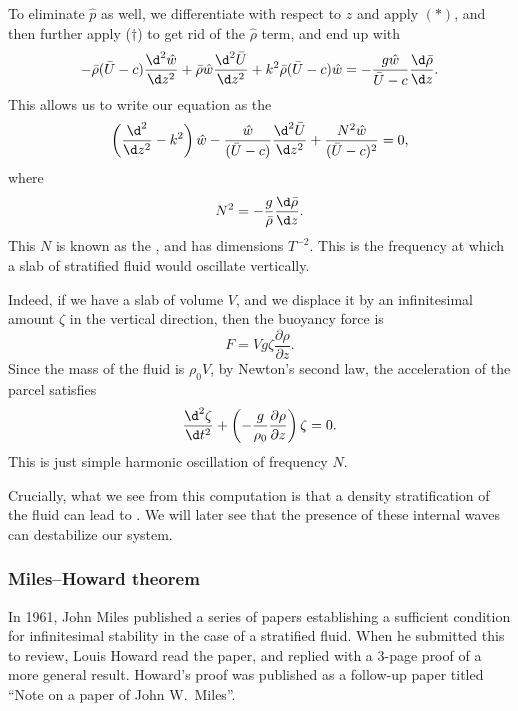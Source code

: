 \documentclass[a4paper]{article}
\begin{document}
To eliminate $\hat{p}$ as well, we differentiate with respect to $z$ and apply $(*)$, and then further apply ($\dagger$) to get rid of the $\hat{\rho}$ term, and end up with
\[
  - \bar{\rho} (\bar{U} - c) \frac{\d^2 \hat{w}}{\d z^2} + \bar{\rho} \hat{w} \frac{\d^2 \bar{U}}{\d z^2} + k^2 \bar{\rho}(\bar{U} - c) \hat{w} = - \frac{g \hat{w}}{\bar{U} - c} \frac{\d \bar{\rho}}{\d z}.
\]
This allows us to write our equation as the 
\[
  \left(\frac{\d^2}{\d z^2} - k^2\right) \hat{w} - \frac{\hat{w}}{(\bar{U} - c)} \frac{\d^2 \bar{U}}{\d z^2} + \frac{N^2 \hat{w}}{(\bar{U} - c)^2} = 0,
\]
where
\[
  N^2 = - \frac{g}{\bar{\rho}} \frac{\d \bar{\rho}}{\d z}.
\]
This $N$ is known as the , and has dimensions $T^{-2}$. This is the frequency at which a slab of stratified fluid would oscillate vertically.

Indeed, if we have a slab of volume $V$, and we displace it by an infinitesimal amount $\zeta$ in the vertical direction, then the buoyancy force is
\[
  F = Vg \zeta \frac{\partial \rho}{\partial z}.
\]
Since the mass of the fluid is $\rho_0 V$, by Newton's second law, the acceleration of the parcel satisfies
\[
  \frac{\d^2 \zeta}{\d t^2} + \left(- \frac{g}{\rho_0} \frac{\partial \rho}{\partial z}\right) \zeta = 0.
\]
This is just simple harmonic oscillation of frequency $N$.

Crucially, what we see from this computation is that a density stratification of the fluid can lead to . We will later see that the presence of these internal waves can destabilize our system.

\subsubsection*{Miles--Howard theorem}
In 1961, John Miles published a series of papers establishing a sufficient condition for infinitesimal stability in the case of a stratified fluid. When he submitted this to review, Louis Howard read the paper, and replied with a 3-page proof of a more general result. Howard's proof was published as a follow-up paper titled ``Note on a paper of John W.\ Miles''.
\end{document}
